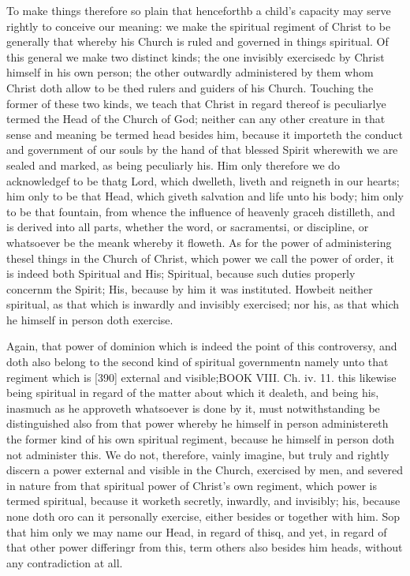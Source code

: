 To make things therefore so plain that henceforthb a child’s capacity may serve rightly to conceive our meaning: we make the spiritual regiment of Christ to be generally that whereby his Church is ruled and governed in things spiritual. Of this general we make two distinct kinds; the one invisibly exercisedc by Christ himself in his own person; the other outwardly administered by them whom Christ doth allow to be thed rulers and guiders of his Church. Touching the former of these two kinds, we teach that Christ in regard thereof is peculiarlye termed the Head of the Church of God; neither can any other creature in that sense and meaning be termed head besides him, because it importeth the conduct and government of our souls by the hand of that blessed Spirit wherewith we are sealed and marked, as being peculiarly his. Him only therefore we do acknowledgef to be thatg Lord, which dwelleth, liveth and reigneth in our hearts; him only to be that Head, which giveth salvation and life unto his body; him only to be that fountain, from whence the influence of heavenly graceh distilleth, and is derived into all parts, whether the word, or sacramentsi, or discipline, or whatsoever be the meank whereby it floweth. As for the power of administering thesel things in the Church of Christ, which power we call the power of order, it is indeed both Spiritual and His; Spiritual, because such duties properly concernm the Spirit; His, because by him it was instituted. Howbeit neither spiritual, as that which is inwardly and invisibly exercised; nor his, as that which he himself in person doth exercise.

Again, that power of dominion which is indeed the point of this controversy, and doth also belong to the second kind of spiritual governmentn namely unto that regiment which is [390] external and visible;BOOK VIII. Ch. iv. 11. this likewise being spiritual in regard of the matter about which it dealeth, and being his, inasmuch as he approveth whatsoever is done by it, must notwithstanding be distinguished also from that power whereby he himself in person administereth the former kind of his own spiritual regiment, because he himself in person doth not administer this. We do not, therefore, vainly imagine, but truly and rightly discern a power external and visible in the Church, exercised by men, and severed in nature from that spiritual power of Christ’s own regiment, which power is termed spiritual, because it worketh secretly, inwardly, and invisibly; his, because none doth oro can it personally exercise, either besides or together with him. Sop that him only we may name our Head, in regard of thisq, and yet, in regard of that other power differingr from this, term others also besides him heads, without any contradiction at all.

